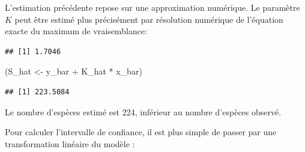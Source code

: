 \documentclass[
  11pt,
  american,
  a4paper,
  extrafontsizes,onecolumn,openright
  ]{memoir}
\newenvironment{Shaded}{\begin{snugshade}}{\end{snugshade}}
\newcommand{\CommentTok}[1]{\textcolor[rgb]{0.56,0.35,0.01}{\textit{#1}}}
\newcommand{\ControlFlowTok}[1]{\textcolor[rgb]{0.13,0.29,0.53}{\textbf{#1}}}
\newcommand{\DecValTok}[1]{\textcolor[rgb]{0.00,0.00,0.81}{#1}}
\newcommand{\FloatTok}[1]{\textcolor[rgb]{0.00,0.00,0.81}{#1}}
\newcommand{\FunctionTok}[1]{\textcolor[rgb]{0.00,0.00,0.00}{#1}}
\newcommand{\NormalTok}[1]{#1}
\newcommand{\OtherTok}[1]{\textcolor[rgb]{0.56,0.35,0.01}{#1}}
\newcommand{\SpecialCharTok}[1]{\textcolor[rgb]{0.00,0.00,0.00}{#1}}
\begin{document}
L'estimation précédente repose sur une approximation numérique.
Le paramètre \(K\) peut être estimé plus précisément par résolution numérique de l'équation exacte du maximum de vraisemblance:

\scriptsize

\begin{Shaded}
\end{Shaded}

\begin{verbatim}
## [1] 1.7046
\end{verbatim}

\begin{Shaded}
\begin{Highlighting}[]
\NormalTok{(S\_hat }\OtherTok{\textless{}{-}}\NormalTok{ y\_bar }\SpecialCharTok{+}\NormalTok{ K\_hat }\SpecialCharTok{*}\NormalTok{ x\_bar)}
\end{Highlighting}
\end{Shaded}

\begin{verbatim}
## [1] 223.5084
\end{verbatim}

\normalsize

Le nombre d'espèces estimé est 224, inférieur au nombre d'espèces observé.

Pour calculer l'intervalle de confiance, il est plus simple de passer par une transformation linéaire du modèle \autocite{Lineweaver1934}:
\end{document}
